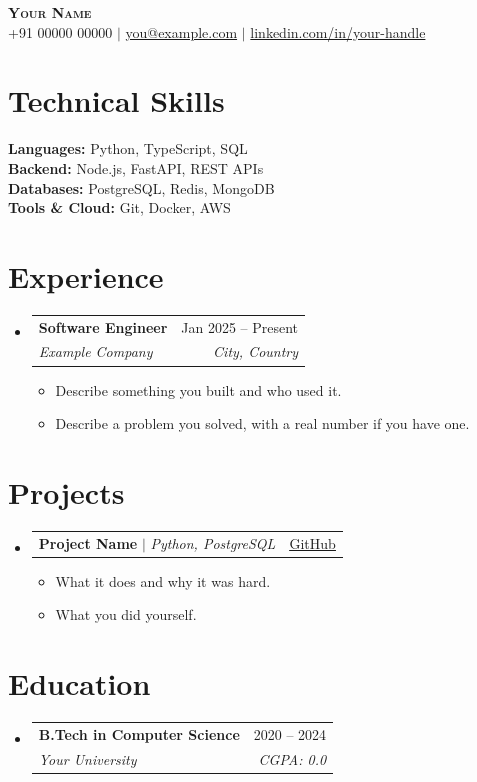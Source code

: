 \documentclass[letterpaper,9pt]{article}
\makeatletter
\newcommand{\resumeItem}[1]{
  \item\small{
    {#1 \vspace{-1pt}}
  }
}
\newcommand{\resumeSubheading}[4]{
  \vspace{-2pt}\item
    \begin{tabular*}{0.97\textwidth}[t]{l@{\extracolsep{\fill}}r}
      \textbf{#1} & #2 \\
      \textit{\small#3} & \textit{\small #4} \\
    \end{tabular*}\vspace{-6pt}
}
\newcommand{\resumeProjectHeading}[2]{
    \item
    \begin{tabular*}{0.97\textwidth}{l@{\extracolsep{\fill}}r}
      \small#1 & #2 \\
    \end{tabular*}\vspace{-7pt}
}
\newcommand{\resumeSubHeadingListStart}{\begin{itemize}[leftmargin=0.1in, label={}]}
\newcommand{\resumeSubHeadingListEnd}{\end{itemize}}
\newcommand{\resumeItemListStart}{\begin{itemize}[leftmargin=0.15in, label={}, itemsep=-1pt]}
\newcommand{\resumeItemListEnd}{\end{itemize}\vspace{-4pt}}
\makeatother
\begin{document}
\begin{center}
  \textbf{\LARGE \scshape Your Name} \\ \vspace{2pt}
  \small +91 00000 00000 $|$
  \href{mailto:you@example.com}{\textcolor{LinkBlue}{you@example.com}} $|$
  \href{https://linkedin.com/in/your-handle}{\textcolor{LinkBlue}{linkedin.com/in/your-handle}}
\end{center}

\section{Technical Skills}
\begin{itemize}[leftmargin=0.15in, label={}]
  \small{
    \item{
      \textbf{Languages:} Python, TypeScript, SQL \\
      \textbf{Backend:} Node.js, FastAPI, REST APIs \\
      \textbf{Databases:} PostgreSQL, Redis, MongoDB \\
      \textbf{Tools \& Cloud:} Git, Docker, AWS \\
    }
  }
\end{itemize}

\section{Experience}
  \resumeSubHeadingListStart

    \resumeSubheading
      {Software Engineer}{Jan 2025 -- Present}
      {Example Company}{City, Country}
      \resumeItemListStart
        \resumeItem{Describe something you built and who used it.}
        \resumeItem{Describe a problem you solved, with a real number if you have one.}
      \resumeItemListEnd

  \resumeSubHeadingListEnd

\section{Projects}

  \resumeSubHeadingListStart

    \resumeProjectHeading
      {\textbf{Project Name} $|$ \emph{Python, PostgreSQL}}{\href{https://github.com/you/project}{\textcolor{LinkBlue}{\underline{GitHub}}}}
      \resumeItemListStart
        \resumeItem{What it does and why it was hard.}
        \resumeItem{What you did yourself.}
      \resumeItemListEnd

  \resumeSubHeadingListEnd

\section{Education}
  \resumeSubHeadingListStart
    \resumeSubheading
      {B.Tech in Computer Science}{2020 -- 2024}
      {Your University}{CGPA: 0.0}
  \resumeSubHeadingListEnd
\end{document}
